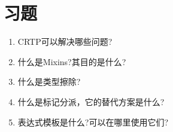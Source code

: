 \section{习题}
\begin{enumerate}
\item
CRTP可以解决哪些问题?

\item
什么是Mixins?其目的是什么?

\item
什么是类型擦除?

\item
什么是标记分派，它的替代方案是什么?

\item
表达式模板是什么?可以在哪里使用它们?
\end{enumerate}